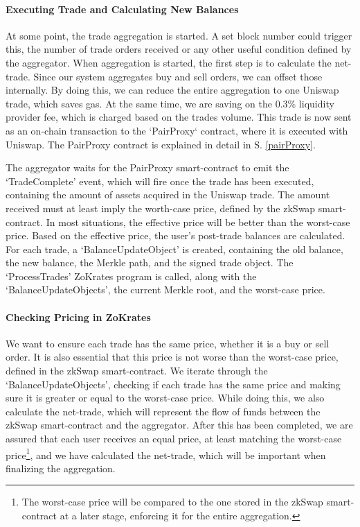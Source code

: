\documentclass[../../thesis.tex]{subfiles}
\begin{document}
\paragraph{Executing Trade and Calculating New Balances}
At some point, the trade aggregation is started. A set block number could trigger this, the number of trade orders received or any other useful condition defined by the aggregator. When aggregation is started, the first step is to calculate the net-trade. Since our system aggregates buy and sell orders, we can offset those internally. By doing this, we can reduce the entire aggregation to one Uniswap trade, which saves gas. At the same time, we are saving on the 0.3\% liquidity provider fee, which is charged based on the trades volume. This trade is now sent as an on-chain transaction to the `PairProxy` contract, where it is executed with Uniswap. The PairProxy contract is explained in detail in S. \ref{pairProxy}. 

The aggregator waits for the PairProxy smart-contract to emit the `TradeComplete' event, which will fire once the trade has been executed, containing the amount of assets acquired in the Uniswap trade. The amount received must at least imply the worth-case price, defined by the zkSwap smart-contract. In most situations, the effective price will be better than the worst-case price. Based on the effective price, the user's post-trade balances are calculated. For each trade, a `BalanceUpdateObject' is created, containing the old balance, the new balance, the Merkle path, and the signed trade object. The `ProcessTrades' ZoKrates program is called, along with the `BalanceUpdateObjects', the current Merkle root, and the worst-case price.

\paragraph{Checking Pricing in ZoKrates}
We want to ensure each trade has the same price, whether it is a buy or sell order. It is also essential that this price is not worse than the worst-case price, defined in the zkSwap smart-contract. We iterate through the `BalanceUpdateObjects', checking if each trade has the same price and making sure it is greater or equal to the worst-case price. While doing this, we also calculate the net-trade, which will represent the flow of funds between the zkSwap smart-contract and the aggregator. After this has been completed, we are assured that each user receives an equal price, at least matching the worst-case price\footnote{The worst-case price will be compared to the one stored in the zkSwap smart-contract at a later stage, enforcing it for the entire aggregation.}, and we have calculated the net-trade, which will be important when finalizing the aggregation.
\end{document}
